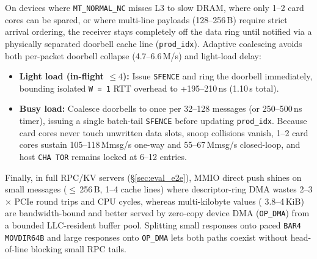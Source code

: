 On devices where \texttt{MT\_NORMAL\_NC} misses L3 to slow DRAM, where only 1--2 card cores can be spared, or where multi-line payloads (128--256\,B) require strict arrival ordering, the receiver stays completely off the data ring until notified via a physically separated doorbell cache line (\texttt{prod\_idx}). Adaptive coalescing avoids both per-packet doorbell collapse (4.7--6.6\,M/s) and light-load delay:
\begin{itemize}
  \item \textbf{Light load (in-flight $\le 4$):} Issue \texttt{SFENCE} and ring the doorbell immediately, bounding isolated \texttt{W\,=\,1} RTT overhead to +195--210\,ns (1.10\,\textmu s total).
  \item \textbf{Busy load:} Coalesce doorbells to once per 32--128 messages (or 250--500\,ns timer), issuing a single batch-tail \texttt{SFENCE} before updating \texttt{prod\_idx}. Because card cores never touch unwritten data slots, snoop collisions vanish, 1--2 card cores sustain 105--118\,Mmsg/s one-way and 55--67\,Mmsg/s closed-loop, and host \texttt{CHA TOR} remains locked at 6--12 entries.
\end{itemize}
Finally, in full RPC/KV servers (\S\ref{sec:eval_e2e}), MMIO direct push shines on small messages ($\le$\,256\,B, 1--4 cache lines) where descriptor-ring DMA wastes 2--3$\times$ PCIe round trips and CPU cycles, whereas multi-kilobyte values (\eg{} 3.8--4\,KiB) are bandwidth-bound and better served by zero-copy device DMA (\texttt{OP\_DMA}) from a bounded LLC-resident buffer pool. Splitting small responses onto paced \texttt{BAR4} \texttt{MOVDIR64B} and large responses onto \texttt{OP\_DMA} lets both paths coexist without head-of-line blocking small RPC tails.
